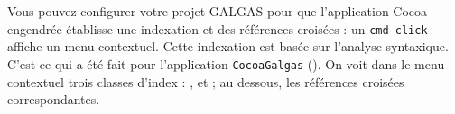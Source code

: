 %
%
%
%
%
%
%
%
%







Vous pouvez configurer votre projet GALGAS pour que l'application Cocoa engendrée établisse une indexation et des références croisées : un \texttt{cmd-click} affiche un menu contextuel. Cette indexation est basée sur l'analyse syntaxique. C'est ce qui a été fait pour l'application \texttt{CocoaGalgas} (). On voit dans le menu contextuel trois classes d'index : ,  et  ; au dessous, les références croisées correspondantes.


